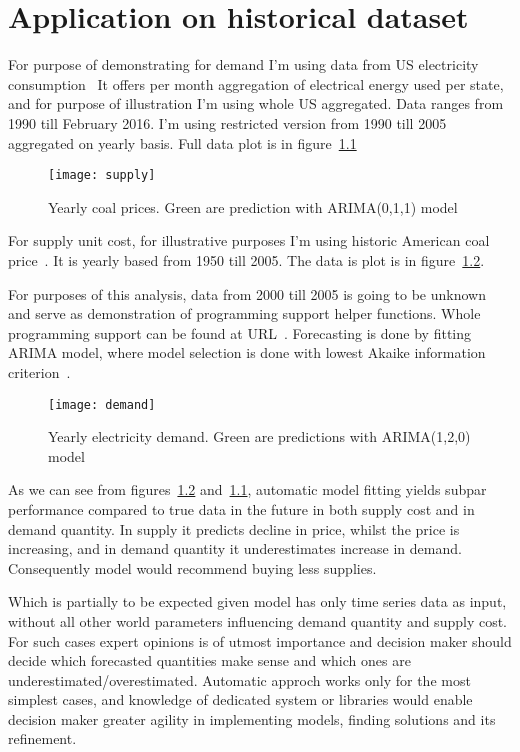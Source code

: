 
\chapter{Application on historical dataset}
\label{chap:Application on historical dataset}

For purpose of demonstrating for demand I'm using data from US electricity consumption~\autocite{us-elec} It offers per month aggregation of electrical energy used per state, and for purpose of illustration I'm using whole US aggregated. Data ranges from 1990 till February 2016. I'm using restricted version from 1990 till 2005 aggregated on yearly basis. Full data plot is in figure~\ref{fig:supply}

\begin{figure}[]
  \centering
  \texttt{[image: supply]}
  \caption{Yearly coal prices. Green are prediction with ARIMA(0,1,1) model}
  \label{fig:supply}
\end{figure}

For supply unit cost, for illustrative purposes I'm using historic American coal price~\autocite{us-coal}. It is yearly based from 1950 till 2005. The data is plot is in figure~\ref{fig:demand}.

For purposes of this analysis, data from 2000 till 2005 is going to be unknown and serve as demonstration of programming support helper functions. Whole programming support can be found at URL~\autocite{code}. Forecasting is done by fitting ARIMA model, where model selection is done with lowest Akaike information criterion~\autocite{Akaike1974}.

\begin{figure}[]
  \centering
  \texttt{[image: demand]}
  \caption{Yearly electricity demand. Green are predictions with ARIMA(1,2,0) model}
  \label{fig:demand}
\end{figure}

As we can see from figures~\ref{fig:demand} and~\ref{fig:supply}, automatic model fitting yields subpar performance compared to true data in the future in both supply cost and in demand quantity. In supply it predicts decline in price, whilst the price is increasing, and in demand quantity it underestimates increase in demand. Consequently model would recommend buying less supplies.

Which is partially to be expected given model has only time series data as input, without all other world parameters influencing demand quantity and supply cost. For such cases expert opinions is of utmost importance and decision maker should decide which forecasted quantities make sense and which ones are underestimated/overestimated. Automatic approch works only for the most simplest cases, and knowledge of dedicated system or libraries would enable decision maker greater agility in implementing models, finding solutions and its refinement.
